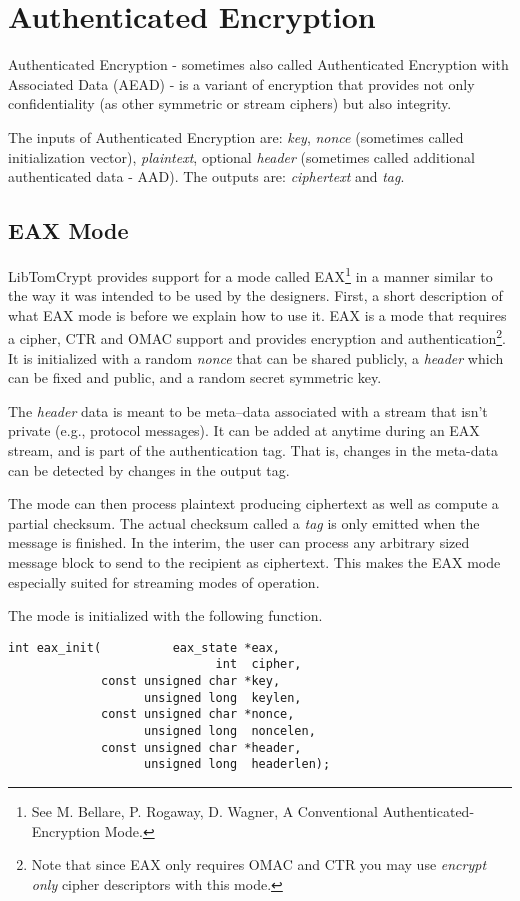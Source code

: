 \documentclass[synpaper]{book}
\newcommand{\mysection}[1]    %
	{                   %
	\section{#1}
   \markboth{\textsf{www.libtom.net}}{\thesection ~ {#1}}
	}
\begin{document}
\chapter{Authenticated Encryption}

Authenticated Encryption - sometimes also called Authenticated Encryption with Associated Data (AEAD) - is a variant of encryption
that provides not only confidentiality (as other symmetric or stream ciphers) but also integrity.

The inputs of Authenticated Encryption are: \textit{key}, \textit{nonce} (sometimes called initialization vector), \textit{plaintext},
optional \textit{header} (sometimes called additional authenticated data - AAD). The outputs are: \textit{ciphertext} and \textit{tag}.

\mysection{EAX Mode}
LibTomCrypt provides support for a mode called EAX\footnote{See
M. Bellare, P. Rogaway, D. Wagner, A Conventional Authenticated-Encryption Mode.} in a manner similar to the way it was intended to be used
by the designers.  First, a short description of what EAX mode is before we explain how to use it.  EAX is a mode that requires a cipher,
CTR and OMAC support and provides encryption and
authentication\footnote{Note that since EAX only requires OMAC and CTR you may use \textit{encrypt only} cipher descriptors with this mode.}.
It is initialized with a random \textit{nonce} that can be shared publicly, a \textit{header} which can be fixed and public, and a random secret symmetric key.

The \textit{header} data is meant to be meta--data associated with a stream that isn't private (e.g., protocol messages).  It can
be added at anytime during an EAX stream, and is part of the authentication tag.  That is, changes in the meta-data can be detected by changes in the output tag.

The mode can then process plaintext producing ciphertext as well as compute a partial checksum.  The actual checksum
called a \textit{tag} is only emitted when the message is finished.  In the interim, the user can process any arbitrary
sized message block to send to the recipient as ciphertext.  This makes the EAX mode especially suited for streaming modes
of operation.

The mode is initialized with the following function.
\begin{verbatim}
int eax_init(          eax_state *eax,
                             int  cipher,
             const unsigned char *key,
                   unsigned long  keylen,
             const unsigned char *nonce,
                   unsigned long  noncelen,
             const unsigned char *header,
                   unsigned long  headerlen);
\end{verbatim}
\end{document}
